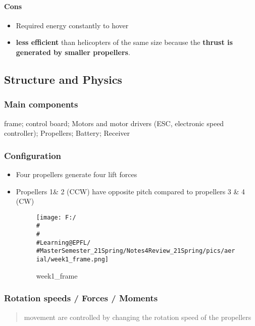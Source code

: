 \documentclass[]{article}
\let\oldparagraph\paragraph
\renewcommand{\paragraph}[1]{\oldparagraph{#1}\mbox{}}
\begin{document}
\paragraph{Cons}\label{header-n219}

\begin{itemize}
\item
  Required energy constantly to hover
\item
  \textbf{less efficient} than helicopters of the same size because the
  \textbf{thrust is generated by smaller propellers}.
\end{itemize}

\subsection{Structure and Physics}\label{header-n225}

\subsubsection{Main components}\label{header-n226}

frame; control board; Motors and motor drivers (ESC, electronic speed
controller); Propellers; Battery; Receiver

\subsubsection{Configuration}\label{header-n228}

\begin{itemize}
\item
  Four propellers generate four lift forces
\item
  Propellers 1\& 2 (CCW) have opposite pitch compared to propellers 3 \&
  4 (CW)

  \begin{figure}
  \centering
  \texttt{[image: F:/\\\#\\\#\\\#Learning@EPFL/\\\#MasterSemester\_21Spring/Notes4Review\_21Spring/pics/aerial/week1\_frame.png]}
  \caption{week1\_frame}
  \end{figure}
\end{itemize}

\subsubsection{Rotation speeds / Forces / Moments}\label{header-n235}

\begin{quote}
movement are controlled by changing the rotation speed of the propellers
\end{quote}
\end{document}
